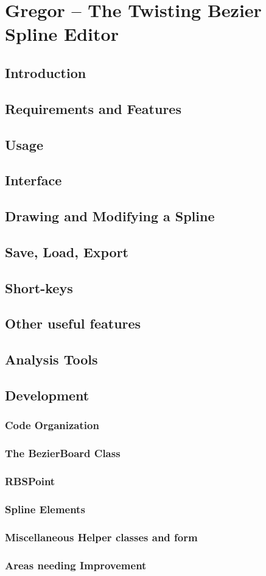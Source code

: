 \section{Gregor -- The Twisting Bezier Spline Editor}
\subsection{Introduction}
\subsection{Requirements and Features}
\subsection{Usage}
\subsection{Interface}
\subsection{Drawing and Modifying a Spline}
\subsection{Save, Load, Export}
\subsection{Short-keys}
\subsection{Other useful features}
\subsection{Analysis Tools}
\subsection{Development}
\subsubsection{Code Organization}
\subsubsection{The BezierBoard Class}
\subsubsection{RBSPoint}
\subsubsection{Spline Elements}
\subsubsection{Miscellaneous Helper classes and form}
\subsubsection{Areas needing Improvement}